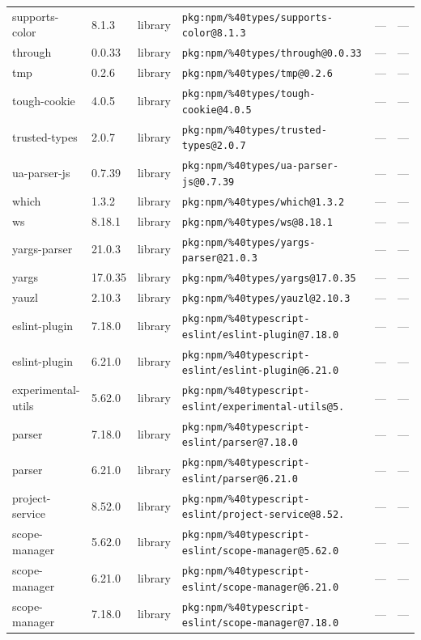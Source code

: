 \documentclass[11pt]{article}
\begin{document}
\begin{longtable}{|l|l|l|p{2.2cm}|l|p{4cm}|}
supports-color & 8.1.3 & library & \texttt{pkg:npm/\%40types/supports-color@8.1.3} & — & — \\
through & 0.0.33 & library & \texttt{pkg:npm/\%40types/through@0.0.33} & — & — \\
tmp & 0.2.6 & library & \texttt{pkg:npm/\%40types/tmp@0.2.6} & — & — \\
tough-cookie & 4.0.5 & library & \texttt{pkg:npm/\%40types/tough-cookie@4.0.5} & — & — \\
trusted-types & 2.0.7 & library & \texttt{pkg:npm/\%40types/trusted-types@2.0.7} & — & — \\
ua-parser-js & 0.7.39 & library & \texttt{pkg:npm/\%40types/ua-parser-js@0.7.39} & — & — \\
which & 1.3.2 & library & \texttt{pkg:npm/\%40types/which@1.3.2} & — & — \\
ws & 8.18.1 & library & \texttt{pkg:npm/\%40types/ws@8.18.1} & — & — \\
yargs-parser & 21.0.3 & library & \texttt{pkg:npm/\%40types/yargs-parser@21.0.3} & — & — \\
yargs & 17.0.35 & library & \texttt{pkg:npm/\%40types/yargs@17.0.35} & — & — \\
yauzl & 2.10.3 & library & \texttt{pkg:npm/\%40types/yauzl@2.10.3} & — & — \\
eslint-plugin & 7.18.0 & library & \texttt{pkg:npm/\%40typescript-eslint/eslint-plugin@7.18.0} & — & — \\
eslint-plugin & 6.21.0 & library & \texttt{pkg:npm/\%40typescript-eslint/eslint-plugin@6.21.0} & — & — \\
experimental-utils & 5.62.0 & library & \texttt{pkg:npm/\%40typescript-eslint/experimental-utils@5.} & — & — \\
parser & 7.18.0 & library & \texttt{pkg:npm/\%40typescript-eslint/parser@7.18.0} & — & — \\
parser & 6.21.0 & library & \texttt{pkg:npm/\%40typescript-eslint/parser@6.21.0} & — & — \\
project-service & 8.52.0 & library & \texttt{pkg:npm/\%40typescript-eslint/project-service@8.52.} & — & — \\
scope-manager & 5.62.0 & library & \texttt{pkg:npm/\%40typescript-eslint/scope-manager@5.62.0} & — & — \\
scope-manager & 6.21.0 & library & \texttt{pkg:npm/\%40typescript-eslint/scope-manager@6.21.0} & — & — \\
scope-manager & 7.18.0 & library & \texttt{pkg:npm/\%40typescript-eslint/scope-manager@7.18.0} & — & — \\

\end{longtable}
\end{document}
